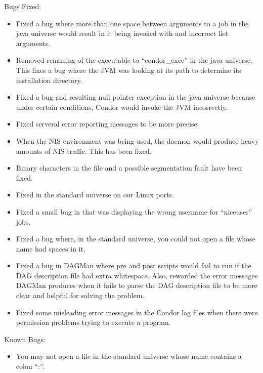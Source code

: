 \noindent Bugs Fixed:
\begin{itemize}

\item Fixed a bug where more than one space between arguments to a job
in the java universe would result in it being invoked with and incorrect
list arguments.

\item Removed renaming of the executable to ``condor_exec'' in the java
universe. This fixes a bug where the JVM was looking at its path to determine
its installation directory.

\item Fixed a bug and resulting null pointer exception in the java universe
because under certain conditions, Condor would invoke the JVM incorrectly.

\item Fixed serveral error reporting messages to be more precise.

\item When the NIS environment was being used, the  daemon
would produce heavy amounts of NIS traffic. This has been fixed.

\item Binary characters in the  file and a possible
segmentation fault have been fixed.

\item Fixed  in the standard universe on our Linux ports.

\item Fixed a small bug in  that was displaying the wrong
username for ``niceuser'' jobs.

\item Fixed a bug where, in the standard universe, you could not open a file
whose name had spaces in it.

\item Fixed a bug in DAGMan where pre and post scripts would fail to
run if the DAG description file had extra whitespace.
Also, reworded the error messages DAGMan produces when it fails to
parse the DAG description file to be more clear and helpful for
solving the problem.

\item Fixed some misleading error messages in the Condor log files
when there were permission problems trying to execute a program. 

\end{itemize}

\noindent Known Bugs:
\begin{itemize}

\item You may not open a file in the standard universe whose name contains a
colon ``:''.

\end{itemize}

